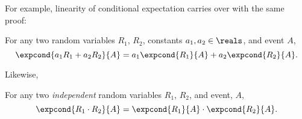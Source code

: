 For example, linearity of conditional expectation carries over
with the same proof:
\begin{theorem}\label{condexplin}
For any two random variables $R_1$, $R_2$, constants
$a_1,a_2\in\reals$, and event $A$, 
\[
\expcond{a_1R_1+a_2R_2}{A} = a_1\expcond{R_1}{A} + a_2\expcond{R_2}{A}.
\]
\end{theorem}

Likewise,
\begin{theorem}
For any two \emph{independent} random variables $R_1$, $R_2$, and event, $A$,
\[
\expcond{R_1 \cdot R_2}{A} = \expcond{R_1}{A} \cdot \expcond{R_2}{A}.
\]
\end{theorem}

\endinput